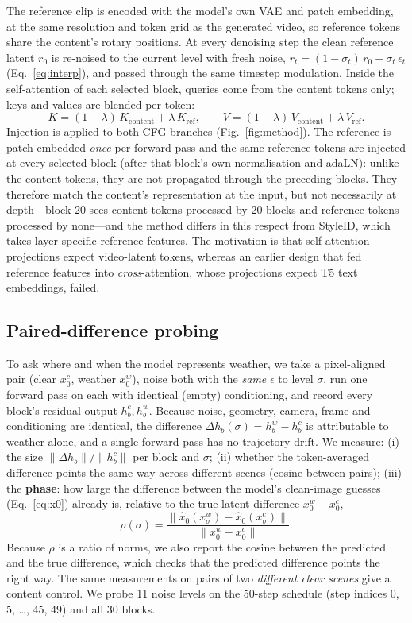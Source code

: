 \documentclass[11pt,a4paper]{article}
\newcommand{\lam}{\lambda}
\newcommand{\xhat}{\hat{x}_0}
\begin{document}
The reference clip is encoded with the model's own VAE and patch embedding, at the same resolution and token grid as the generated video, so reference tokens share the content's rotary positions.
At every denoising step the clean reference latent $r_0$ is re-noised to the current level with fresh noise, $r_t = (1-\sigma_t)\,r_0 + \sigma_t\,\epsilon_t$ (Eq.~\ref{eq:interp}), and passed through the same timestep modulation.
Inside the self-attention of each selected block, queries come from the content tokens only; keys and values are blended per token:
\begin{equation}
K = (1-\lam)\,K_{\mathrm{content}} + \lam\,K_{\mathrm{ref}},\qquad
V = (1-\lam)\,V_{\mathrm{content}} + \lam\,V_{\mathrm{ref}} .
\end{equation}
Injection is applied to both CFG branches (Fig.~\ref{fig:method}).
The reference is patch-embedded \emph{once} per forward pass and the same reference tokens are injected at every selected block (after that block's own normalisation and adaLN): unlike the content tokens, they are not propagated through the preceding blocks. They therefore match the content's representation at the input, but not necessarily at depth---block 20 sees content tokens processed by 20 blocks and reference tokens processed by none---and the method differs in this respect from StyleID, which takes layer-specific reference features. The motivation is that self-attention projections expect video-latent tokens, whereas an earlier design that fed reference features into \emph{cross}-attention, whose projections expect T5 text embeddings, failed.

\subsection{Paired-difference probing}
\label{sec:probe}
To ask where and when the model represents weather, we take a pixel-aligned pair (clear $x^c_0$, weather $x^w_0$), noise both with the \emph{same} $\epsilon$ to level $\sigma$, run one forward pass on each with identical (empty) conditioning, and record every block's residual output $h^c_b, h^w_b$.
Because noise, geometry, camera, frame and conditioning are identical, the difference $\Delta h_b(\sigma) = h^w_b - h^c_b$ is attributable to weather alone, and a single forward pass has no trajectory drift.
We measure: (i) the size $\|\Delta h_b\|/\|h^c_b\|$ per block and $\sigma$; (ii) whether the token-averaged difference points the same way across different scenes (cosine between pairs); (iii) the \textbf{phase}: how large the difference between the model's clean-image guesses (Eq.~\ref{eq:x0}) already is, relative to the true latent difference $x^w_0 - x^c_0$,
\begin{equation}
\label{eq:rho}
\rho(\sigma) = \frac{\|\xhat(x^w_\sigma) - \xhat(x^c_\sigma)\|}{\|x^w_0 - x^c_0\|}.
\end{equation}
Because $\rho$ is a ratio of norms, we also report the cosine between the predicted and the true difference, which checks that the predicted difference points the right way. The same measurements on pairs of two \emph{different clear scenes} give a content control.
We probe 11 noise levels on the 50-step schedule (step indices 0, 5, \dots, 45, 49) and all 30 blocks.
\end{document}

